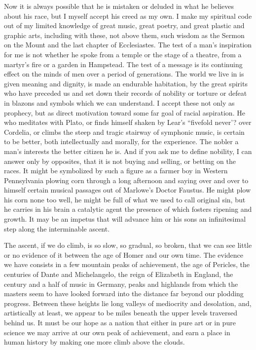 \documentclass[9pt,twoside]{extarticle}
\begin{document}
Now it is always possible that he is mistaken or deluded in what he believes about his race, but I myself accept his creed as my own. I make my spiritual code out of my limited knowledge of great music, great poetry, and great plastic and graphic arts, including with these, not above them, such wisdom as the Sermon on the Mount and the last chapter of Ecclesiastes. The test of a man's inspiration for me is not whether he spoke from a temple or the stage of a theatre, from a martyr's fire or a garden in Hampstead. The test of a message is its continuing effect on the minds of men over a period of generations. The world we live in is given meaning and dignity, is made an endurable habitation, by the great spirits who have preceded us and set down their records of nobility or torture or defeat in blazons and symbols which we can understand. I accept these not only as prophecy, but as direct motivation toward some far goal of racial aspiration. He who meditates with Plato, or finds himself shaken by Lear's ``fivefold never'? over Cordelia, or climbs the steep and tragic stairway of symphonic music, is certain to be better, both intellectually and morally, for the experience. The nobler a man's interests the better citizen he is. And if you ask me to define nobility, I can answer only by opposites, that it is not buying and selling, or betting on the races. It might be symbolized by such a figure as a farmer boy in Western Pennsylvania plowing corn through a long afternoon and saying over and over to himself certain musical passages out of Marlowe's Doctor Faustus. He might plow his corn none too well, he might be full of what we used to call original sin, but he carries in his brain a catalytic agent the presence of which fosters ripening and growth. It may be an impetus that will advance him or his sons an infinitesimal step along the interminable ascent.

The ascent, if we do climb, is so slow, so gradual, so broken, that we can see little or no evidence of it between the age of Homer and our own time. The evidence we have consists in a few mountain peaks of achievement, the age of Pericles, the centuries of Dante and Michelangelo, the reign of Elizabeth in England, the century and a half of music in Germany, peaks and highlands from which the masters seem to have looked forward into the distance far beyond our plodding progress. Between these heights lie long valleys of mediocrity and desolation, and, artistically at least, we appear to be miles beneath the upper levels traversed behind us. It must be our hope as a nation that either in pure art or in pure science we may arrive at our own peak of achievement, and earn a place in human history by making one more climb above the clouds.
\end{document}
